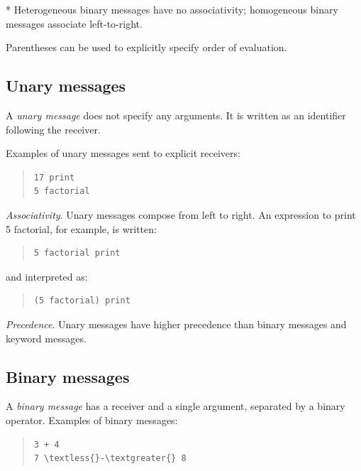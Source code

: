 \documentclass[letterpaper,10pt,english]{sphinxmanual}
\begin{document}
* Heterogeneous binary messages have no associativity; homogeneous binary messages associate left-to-right.

Parentheses can be used to explicitly specify order of evaluation.


\subsection{Unary messages}
\label{langref:unary-messages}\label{langref:index-44}
A \emph{unary message} does not specify any arguments. It is written as an identifier following the receiver.

Examples of unary messages sent to explicit receivers:
\begin{quote}

\begin{Verbatim}[commandchars=\\\{\}]
17 print
5 factorial
\end{Verbatim}
\end{quote}

\emph{Associativity}. Unary messages compose from left to right. An expression to print 5 factorial, for example, is written:
\begin{quote}

\begin{Verbatim}[commandchars=\\\{\}]
5 factorial print
\end{Verbatim}
\end{quote}

and interpreted as:
\begin{quote}

\begin{Verbatim}[commandchars=\\\{\}]
(5 factorial) print
\end{Verbatim}
\end{quote}

\emph{Precedence}. Unary messages have higher precedence than binary messages and keyword messages.


\subsection{Binary messages}
\label{langref:index-47}\label{langref:binary-messages}
A \emph{binary message} has a receiver and a single argument, separated by a binary operator. Examples of binary messages:
\begin{quote}

\begin{Verbatim}[commandchars=\\\{\}]
3 + 4
7 \textless{}-\textgreater{} 8
\end{Verbatim}
\end{quote}
\end{document}

